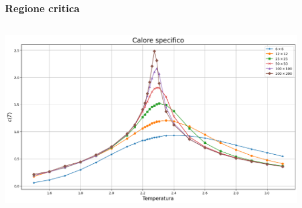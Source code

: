 \begin{frame}
    \frametitle{Regione critica}
    \framesubtitle{}

    \begin{columns}
        \begin{column}{0.5\textwidth}

            \centering
            \includegraphics[width=\textwidth]{Immagini/simIsing2D/cp_zCrit.png}

        \end{column}
    
        \begin{column}{0.5\textwidth}
            
        \end{column}
    \end{columns}

\end{frame}



